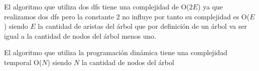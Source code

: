 El algoritmo que utiliza dos dfs tiene una complejidad de O($2E$) ya que realizamos dos dfs pero la constante $2$ no influye por tanto su complejidad es O($E$)  siendo $E$ la cantidad de aristas del árbol que por definición de un árbol va ser igual a la cantidad de nodos del árbol menos uno.

El algoritmo que utiliza la programación dinámica tiene una complejidad temporal O($N$) siendo $N$ la cantidad de nodos del árbol 